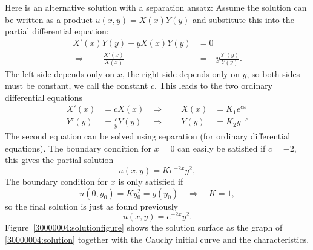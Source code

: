 \begin{loesung}
Here is an alternative solution with a separation ansatz:
Assume the solution can be written as a product $u(x,y)=X(x)Y(y)$
and substitute this into the partial differential equation:
\begin{align*}
X'(x)Y(y)+yX(x)Y(y)&=0\\
\Rightarrow\qquad \frac{X'(x)}{X(x)}&=-y\frac{Y'(y)}{Y(y)}.
\end{align*}
The left side depends only on $x$, the right side depends only on $y$,
so both sides must be constant, we call the constant $c$.
This leads to the two ordinary differential equations
\begin{align*}
X'(x)&=cX(x)&\Rightarrow\qquad X(x)&=K_1e^{cx}\\
Y'(y)&=\frac{c}{y}Y(y)&\Rightarrow\qquad Y(y)&=K_2y^{-c}
\end{align*}
The second equation can be solved using separation (for ordinary
differential equations).
The boundary condition for $x=0$ can easily be satisfied if
$c=-2$, this gives the partial solution
\[
u(x,y)=Ke^{-2x}y^2,
\]
The boundary condition for $x$ is only satisfied  if
\[
u(0,y_0)=Ky_0^2=g(y_0)\quad\Rightarrow\quad K=1,
\]
so the final solution is just as found previously
\begin{equation}
u(x,y)=e^{-2x}y^2.
\label{30000004:solution}
\end{equation}
Figure~\ref{30000004:solutionfigure} shows the solution surface as the
graph of \eqref{30000004:solution} together 
with the Cauchy initial curve and the characteristics.
\end{loesung}
